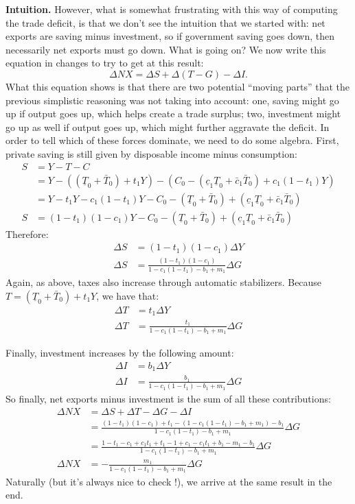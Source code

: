 \documentclass[]{book}
\theoremstyle{definition}
\theoremstyle{definition}
\theoremstyle{definition}
\theoremstyle{remark}
\begin{document}
\textbf{Intuition.} However, what is somewhat frustrating with this way
of computing the trade deficit, is that we don't see the intuition that
we started with: net exports are saving minus investment, so if
government saving goes down, then necessarily net exports must go down.
What is going on? We now write this equation in changes to try to get at
this result: \[\Delta NX = \Delta S + \Delta(T-G) -\Delta I.\] What this
equation shows is that there are two potential ``moving parts'' that the
previous simplistic reasoning was not taking into account: one, saving
might go up if output goes up, which helps create a trade surplus; two,
investment might go up as well if output goes up, which might further
aggravate the deficit. In order to tell which of these forces dominate,
we need to do some algebra. First, private saving is still given by
disposable income minus consumption: \[
\begin{aligned}
S &= Y-T-C\\
&=Y-\left(\left(\underline{T}_{0}+\bar{T}_{0}\right)+t_1 Y\right) - \left(C_0 -\left(\underline{c}_{1}\underline{T}_0+\bar{c}_{1}\bar{T}_0\right)+c_1 (1-t_1) Y\right)\\
&=Y - t_1 Y - c_1(1-t_1)Y-C_0 - \left(\underline{T}_{0}+\bar{T}_{0}\right)+\left(\underline{c}_{1}\underline{T}_0+\bar{c}_{1}\bar{T}_0\right)\\
S&=(1-t_1)(1-c_1)Y-C_0 - \left(\underline{T}_{0}+\bar{T}_{0}\right)+\left(\underline{c}_{1}\underline{T}_0+\bar{c}_{1}\bar{T}_0\right)
\end{aligned}
\] Therefore: \[
\begin{aligned}
\Delta S &= (1-t_1)(1-c_1)\Delta Y\\
\Delta S&=\frac{(1-t_1)(1-c_1)}{1-c_1(1-t_1)-b_1+m_1}\Delta G
\end{aligned}
\] Again, as above, taxes also increase through automatic stabilizers.
Because \(T=\left(\underline{T}_{0}+\bar{T}_{0}\right)+t_1 Y\), we have
that: \[
\begin{aligned}
\Delta T &= t_1 \Delta Y\\
\Delta T&= \frac{t_1 }{1-c_1(1-t_1)-b_1+m_1}\Delta G
\end{aligned}
\]

Finally, investment increases by the following amount: \[
\begin{aligned}
\Delta I &= b_1 \Delta Y\\
\Delta I&=\frac{b_1}{1-c_1(1-t_1)-b_1+m_1}\Delta G
\end{aligned}
\] So finally, net exports minus investment is the sum of all these
contributions: \[
\begin{aligned}
\Delta NX &= \Delta S + \Delta T-\Delta G -\Delta I\\
 &= \frac{(1-t_1)(1-c_1)+t_1-\left(1-c_1(1-t_1)-b_1+m_1\right)-b_1}{1-c_1(1-t_1)-b_1+m_1}\Delta G\\
 &= \frac{1-t_1-c_1+c_1 t_1+t_1-1+c_1-c_1 t_1+b_1-m_1-b_1}{1-c_1(1-t_1)-b_1+m_1}\Delta G\\
 \Delta NX&= -\frac{m_1}{1-c_1(1-t_1)-b_1+m_1}\Delta G
\end{aligned}
\] Naturally (but it's always nice to check !), we arrive at the same
result in the end.
\end{document}
